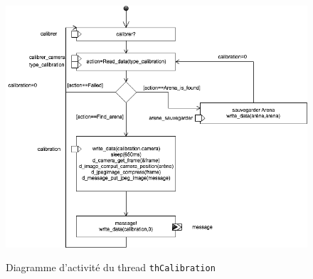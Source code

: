 \documentclass[11pt, a4paper]{paper}
\begin{document}
\begin{figure}[htbp]
\label{fig:act_calibration}
\begin{center}
{\includegraphics[scale=.4]{./figures/calibration}}
{\caption{Diagramme d'activité du thread {\tt thCalibration}}}
\end{center}
\end{figure}
\FloatBarrier
\end{document}
